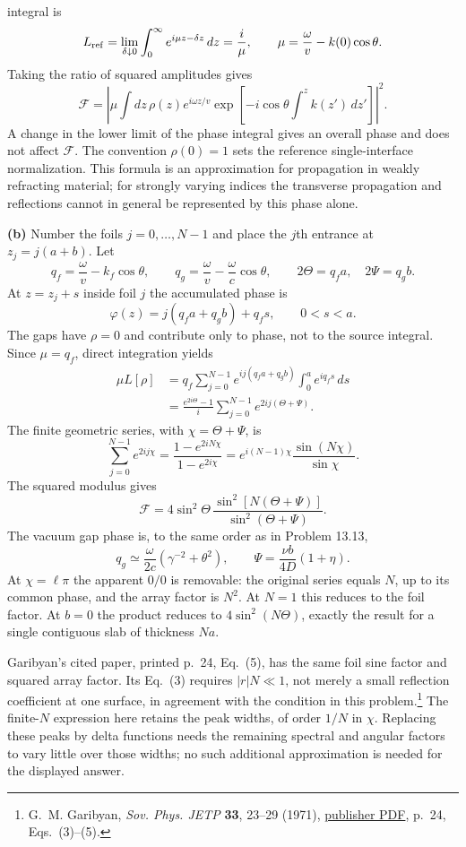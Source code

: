 integral is
\[
 L_{\rm ref}=\lim_{\delta\downarrow0}
 \int_0^\infty e^{i\mu z-\delta z}\,dz
 =\frac{i}{\mu},\qquad
 \mu=\frac{\omega}{v}-k(0)\cos\theta.
\]
Taking the ratio of squared amplitudes gives
\[
 \boxed{\mathcal F
 =\left|\mu\int dz\,\rho(z)e^{i\omega z/v}
       \exp\!\left[-i\cos\theta\int^z k(z')\,dz'\right]\right|^2.}
\]
A change in the lower limit of the phase integral gives an overall phase
and does not affect $\mathcal F$. The convention $\rho(0)=1$
sets the reference single-interface normalization. This formula is an
approximation for propagation in weakly refracting material; for strongly
varying indices the transverse propagation and reflections cannot in
general be represented by this phase alone.

\textbf{(b)} Number the foils $j=0,\ldots,N-1$ and place the $j$th
entrance at $z_j=j(a+b)$. Let
\[
 q_f=\frac{\omega}{v}-k_f\cos\theta,\qquad
 q_g=\frac{\omega}{v}-\frac{\omega}{c}\cos\theta,
 \qquad
 2\Theta=q_fa,\quad 2\Psi=q_gb.
\]
At $z=z_j+s$ inside foil $j$ the accumulated phase is
\[
 \varphi(z)=j(q_fa+q_gb)+q_fs,\qquad 0<s<a.
\]
The gaps have $\rho=0$ and contribute only to phase, not to the source
integral. Since $\mu=q_f$, direct integration yields
\[
 \begin{split}
 \mu L[\rho]
 &=q_f\sum_{j=0}^{N-1}
   e^{ij(q_fa+q_gb)}\int_0^a e^{iq_fs}\,ds\\
 &=\frac{e^{2i\Theta}-1}{i}
   \sum_{j=0}^{N-1}e^{2ij(\Theta+\Psi)}.
 \end{split}
\]
The finite geometric series, with $\chi=\Theta+\Psi$, is
\[
 \sum_{j=0}^{N-1}e^{2ij\chi}
 =\frac{1-e^{2iN\chi}}{1-e^{2i\chi}}
 =e^{i(N-1)\chi}\frac{\sin(N\chi)}{\sin\chi}.
\]
The squared modulus gives
\[
 \boxed{\mathcal F=
 4\sin^2\Theta\,
 \frac{\sin^2[N(\Theta+\Psi)]}{\sin^2(\Theta+\Psi)}.}
\]
The vacuum gap phase is, to the same order as in Problem 13.13,
\[
 q_g\simeq\frac{\omega}{2c}(\gamma^{-2}+\theta^2),
 \qquad
 \boxed{\Psi=\frac{\nu b}{4D}(1+\eta).}
\]
At $\chi=\ell\pi$ the apparent $0/0$ is removable:
the original series equals $N$, up to its common phase, and the array
factor is $N^2$. At $N=1$ this reduces to the foil factor. At $b=0$
the product reduces to $4\sin^2(N\Theta)$, exactly the result for a
single contiguous slab of thickness $Na$.

Garibyan's cited paper, printed p.~24, Eq.~(5), has the same foil
sine factor and squared array factor. Its Eq.~(3) requires
$|r|N\ll1$, not merely a small reflection coefficient at one surface,
in agreement with the condition in this problem.\footnote{G.~M. Garibyan,
\emph{Sov. Phys. JETP} \textbf{33}, 23--29 (1971),
\href{https://jetp.ras.ru/cgi-bin/dn/e_033_01_0023.pdf}{publisher PDF},
p.~24, Eqs.~(3)--(5).}
The finite-$N$ expression here retains the peak widths, of order $1/N$
in $\chi$. Replacing these peaks by delta functions needs the remaining
spectral and angular factors to vary little over those widths; no such
additional approximation is needed for the displayed answer.



